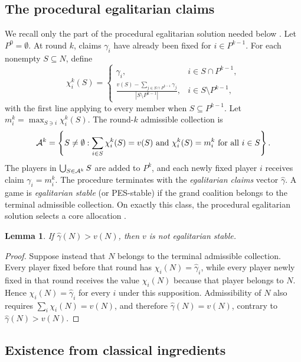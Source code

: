 \documentclass[11pt]{article}
\newtheorem{lemma}[theorem]{Lemma}
\begin{document}
\subsection{The procedural egalitarian claims}

We recall only the part of the procedural egalitarian solution needed below
\citep{DBH2017,Dietzenbacher2021}. Let $P^0=\emptyset$. At round $k$, claims
$\gamma_i$ have already been fixed for $i\in P^{k-1}$. For each nonempty
$S\subseteq N$, define
\[
 \chi_i^k(S)=
 \begin{cases}
  \gamma_i,
    &i\in S\cap P^{k-1},\\[3pt]
  \displaystyle
  \frac{v(S)-\sum_{j\in S\cap P^{k-1}}\gamma_j}
       {|S\setminus P^{k-1}|},
    &i\in S\setminus P^{k-1},
 \end{cases}
\]
with the first line applying to every member when $S\subseteq P^{k-1}$.
Let $m_i^k=\max_{S\ni i}\chi_i^k(S)$. The round-$k$ admissible collection is
\[
 {\cal A}^k=
 \left\{S\ne\emptyset:
   \sum_{i\in S}\chi_i^k(S)=v(S)
   \text{ and }\chi_i^k(S)=m_i^k\text{ for all }i\in S
 \right\}.
\]
The players in $\bigcup_{S\in{\cal A}^k}S$ are added to $P^k$, and each newly
fixed player $i$ receives claim $\gamma_i=m_i^k$. The procedure terminates
with the \emph{egalitarian claims} vector $\widehat\gamma$. A game is
\emph{egalitarian stable} (or PES-stable) if the grand coalition belongs to
the terminal admissible collection. On exactly this class, the procedural
egalitarian solution selects a core allocation \citep{Dietzenbacher2021}.

\begin{lemma}\label{lem:oversum}
If $\widehat\gamma(N)>v(N)$, then $v$ is not egalitarian stable.
\end{lemma}

\begin{proof}
Suppose instead that $N$ belongs to the terminal admissible collection. Every
player fixed before that round has $\chi_i(N)=\widehat\gamma_i$, while every
player newly fixed in that round receives the value $\chi_i(N)$ because that
player belongs to $N$. Hence $\chi_i(N)=\widehat\gamma_i$ for every $i$ under
this supposition. Admissibility of $N$ also requires
$\sum_i\chi_i(N)=v(N)$, and therefore $\widehat\gamma(N)=v(N)$, contrary to
$\widehat\gamma(N)>v(N)$.
\end{proof}

\subsection{Existence from classical ingredients}
\end{document}
